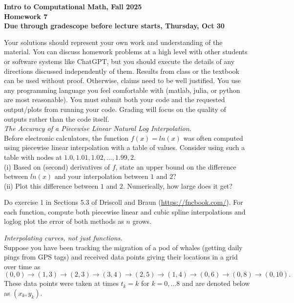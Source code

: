 \documentclass[11pt]{article}
\begin{document}
\begin{center}
{\bf Intro to Computational Math, Fall 2025\\
Homework 7\\
Due through gradescope before lecture starts, Thursday, Oct 30}
\end{center}

Your solutions should represent your own work and understanding of the material. You can discuss homework problems at a high level with other students or software systems like ChatGPT, but you should execute the details of any directions discussed independently of them. Results from class or the textbook can be used without proof. Otherwise, claims need to be well justified. You use any programming language you feel comfortable with (matlab, julia, or python are most reasonable). You must submit both your code and the requested output/plots from running your code. Grading will focus on the quality of outputs rather than the code itself.\\


 {\it The Accuracy of a Piecewise Linear Natural Log Interpolation.}\\
Before electronic calculators, the function $f(x) = ln(x)$ was often computed using piecewise linear interpolation with a table of values. Consider using such a table with nodes at $1.0,1.01,1.02,…,1.99,2$.\\

\noindent (i) Based on (second) derivatives of $f$, state an upper bound on the difference between $ln(x)$ and your interpolation between $1$ and $2$?\\

\noindent (ii) Plot this difference between $1$ and $2$. Numerically, how large does it get?\\


\vskip1cm




 Do exercise 1 in Sections 5.3 of Driscoll and Braun (\url{https://fncbook.com/}). For each function, compute both piecewise linear and cubic spline interpolations and loglog plot the error of both methods as $n$ grows.\\
\vskip1cm


 {\it Interpolating curves, not just functions.}\\
Suppose you have been tracking the migration of a pod of whales (getting daily pings from GPS tags) and received data points giving their locations in a grid over time as
$$ (0,0)\rightarrow (1,3)\rightarrow(2,3)\rightarrow(3,4)\rightarrow(2,5)\rightarrow(1,4)\rightarrow(0,6)\rightarrow(0,8)\rightarrow(0,10) .$$
These data points were taken at times $t_k = k$ for $k=0,\dots 8$ and are denoted below as $(x_k,y_k)$.
\end{document}
